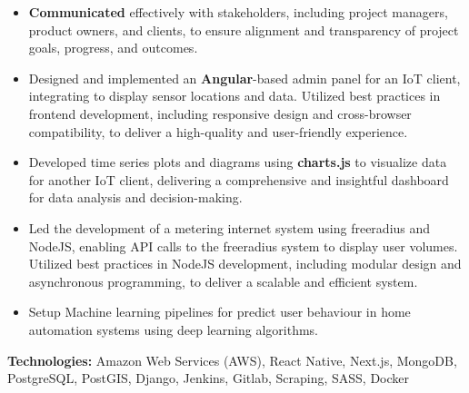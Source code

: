 \begin{itemize}
  \item \textbf{Communicated} effectively with stakeholders, including project managers, product owners, and clients,
    to ensure alignment and transparency of project goals, progress, and outcomes.
  \item Designed and implemented an \textbf{Angular}-based admin panel for an IoT client,
    integrating  to display sensor locations and data. Utilized best practices in frontend development, including responsive design and cross-browser compatibility, to deliver a high-quality and user-friendly experience.
  \item Developed time series plots and diagrams using \textbf{charts.js} to visualize data for another IoT client, delivering a comprehensive and insightful dashboard for data analysis and decision-making.
  \item Led the development of a metering internet system using freeradius and NodeJS, enabling API calls to the freeradius system to display user volumes.
    Utilized best practices in NodeJS development, including modular design and asynchronous programming, to deliver a scalable and efficient system.
  \item Setup Machine learning pipelines for predict user behaviour in home automation systems using deep learning algorithms.
\end{itemize}
\textbf{Technologies:}
Amazon Web Services (AWS), React Native, Next.js, MongoDB, PostgreSQL, PostGIS, Django,
Jenkins, Gitlab, Scraping, SASS, Docker
